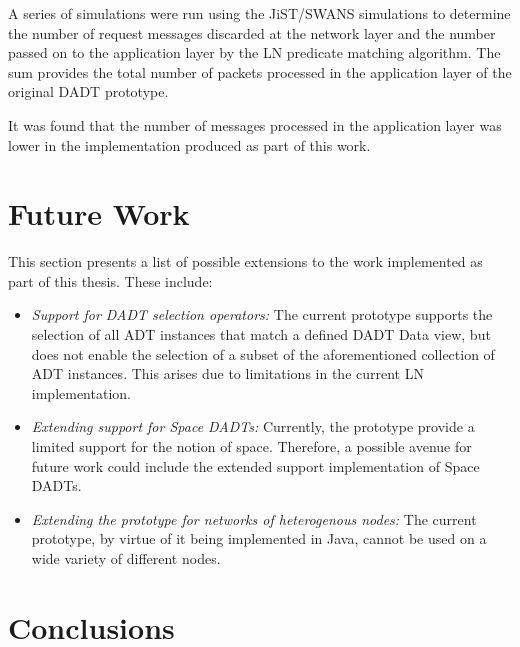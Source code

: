 A series of simulations were run using the JiST/SWANS simulations to determine
the number of request messages discarded at the network layer and the number
passed on to the application layer by the LN predicate matching algorithm. The
sum provides the total number of packets processed in the application layer of
the original DADT prototype.

It was found that the number of messages processed in the application layer was
lower in the implementation produced as part of this work.


%


\section{Future Work}

This section presents a list of possible extensions to the work implemented as
part of this thesis. These include:

\begin{itemize}
  \item \emph{Support for DADT selection operators:} The current prototype
  supports the selection of all ADT instances that match a defined DADT Data
  view, but does not enable the selection of a subset of the aforementioned
  collection of ADT instances. This arises due to limitations in the current LN implementation.
  \item \emph{Extending support for Space DADTs:} Currently, the prototype
  provide a limited support for the notion of space. Therefore, a
  possible avenue for future work could include the extended support implementation of Space DADTs.
  \item \emph{Extending the prototype for networks of heterogenous nodes:}
  The current prototype, by virtue of it being implemented in Java, cannot be
  used on a wide variety of different nodes. 
\end{itemize}

\section{Conclusions}

